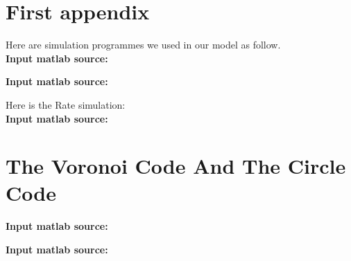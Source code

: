 \documentclass{mcmthesis}
\begin{document}
\begin{appendices}

\section{First appendix}

Here are simulation programmes we used in our model as follow.\\

\textbf{\textcolor[rgb]{0.98,0.00,0.00}{Input matlab source:}}


\textbf{\textcolor[rgb]{0.98,0.00,0.00}{Input matlab source:}}


Here is the Rate simulation:\\

\textbf{\textcolor[rgb]{0.98,0.00,0.00}{Input matlab source:}}


\section{The Voronoi Code And The Circle Code}

\textbf{\textcolor[rgb]{0.98,0.00,0.00}{Input matlab source:}}


\textbf{\textcolor[rgb]{0.98,0.00,0.00}{Input matlab source:}}



\end{appendices}
\end{document}
